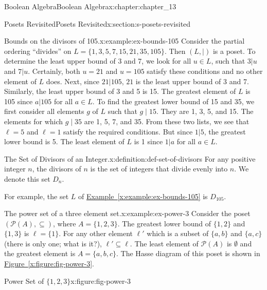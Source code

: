 \documentclass[oneside,10pt,]{book}
\newcommand{\xreffont}{\relax}
\numberwithin{equation}{section}
\begin{document}
\begin{chapterptx}{Boolean Algebra}{}{Boolean Algebra}{}{}{x:chapter:chapter_13}
\begin{sectionptx}{Posets Revisited}{}{Posets Revisited}{}{}{x:section:s-posets-revisited}
\begin{example}{Bounds on the divisors of 105.}{x:example:ex-bounds-105}
Consider the partial ordering ``divides'' on \(L = \{1, 3, 5, 7, 15, 21, 35, 105\}\). Then \((L, \mid)\) is a poset. To determine the least upper bound of 3 and 7, we look for all \(u  \in  L\), such that \(3|u\) and \(7|u\). Certainly, both \(u  = 21\) and \(u  = 105\) satisfy these conditions and no other element of \(L\) does. Next, since \(21|105\),  \(21\) is the least upper bound of 3 and 7. Similarly, the  least upper bound of 3 and 5 is 15. The greatest element of \(L\) is 105 since \(a|105\) for all \(a \in  L\). To find the greatest lower bound of 15 and 35, we first consider all elements \(g\) of \(L\) such that \(g \mid 15\).  They are 1, 3, 5, and 15.  The elements for which  \(g \mid 35\) are 1, 5, 7, and 35. From these two lists, we see that \(\ell = 5\) and \(\ell = 1\) satisfy the required conditions. But since \(1|5\),  the greatest lower bound is 5. The least element of \(L\) is 1 since \(1|a\) for all \(a \in  L\).%
\end{example}
\begin{definition}{The Set of Divisors of an Integer.}{x:definition:def-set-of-divisors}%
%
\label{g:notation:idm546613620976}%
For any positive integer \(n\), the divisors of \(n\) is the set of integers that divide evenly into \(n\).  We denote this set \(D_n\).%
\end{definition}
For example, the set \(L\) of \hyperref[x:example:ex-bounds-105]{Example~{\xreffont\ref{x:example:ex-bounds-105}}} is \(D_{105}\).%
\begin{example}{The power set of a three element set.}{x:example:ex-power-3}%
Consider the poset \((\mathcal{P}(A),\subseteq)\), where \(A = \{1, 2, 3\}\).  The greatest lower bound of  \(\{1, 2\}\) and \(\{1,3\}\) is \(\ell = \{1\}\). For any other element \(\ell'\)  which is a subset of \(\{a,
b\}\) and \(\{a, c\}\) (there is only one; what is it?), \(\ell' \subseteq  \ell\). The least element of \(\mathcal{P}(A)\) is \(\emptyset\)  and the greatest element  is \(A=\{a, b, c\}\). The Hasse diagram of this poset is shown in \hyperref[x:figure:fig-power-3]{Figure~{\xreffont\ref{x:figure:fig-power-3}}}.%
\begin{figureptx}{Power Set of \(\{1, 2, 3\}\)}{x:figure:fig-power-3}{}%
\begin{image}{0.3}{0.4}{0.3}%

\end{image}
\end{figureptx}
\end{example}
\end{sectionptx}
\end{chapterptx}
\end{document}

